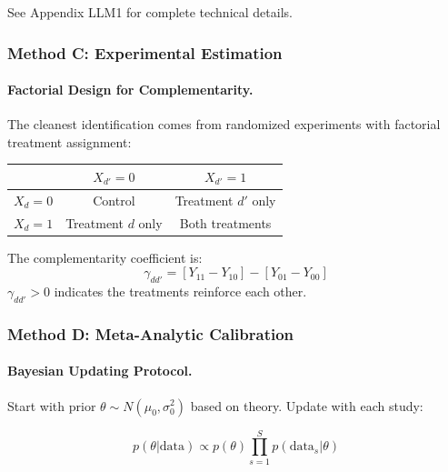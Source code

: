 See Appendix LLM1 for complete technical details.

\subsubsection{Method C: Experimental Estimation}

\paragraph{Factorial Design for Complementarity.}

The cleanest identification comes from randomized experiments with factorial 
treatment assignment:

\begin{center}
\begin{tabular}{c|cc}
& $X_{d'} = 0$ & $X_{d'} = 1$ \\
\hline
$X_d = 0$ & Control & Treatment $d'$ only \\
$X_d = 1$ & Treatment $d$ only & Both treatments \\
\end{tabular}
\end{center}

\begin{theorem}
\label{thm:factorial}
The complementarity coefficient is:
\begin{equation}
\gamma_{dd'} = [Y_{11} - Y_{10}] - [Y_{01} - Y_{00}]
\end{equation}
$\gamma_{dd'} > 0$ indicates the treatments reinforce each other.
\end{theorem}

\subsubsection{Method D: Meta-Analytic Calibration}

\paragraph{Bayesian Updating Protocol.}

Start with prior $\theta \sim N(\mu_0, \sigma_0^2)$ based on theory. Update with 
each study:

\begin{equation}
p(\theta | \text{data}) \propto p(\theta) \prod_{s=1}^{S} p(\text{data}_s | \theta)
\end{equation}


